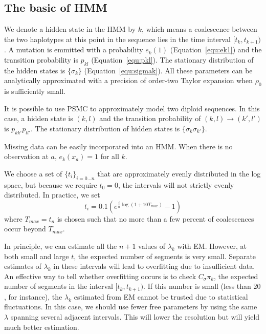 \documentclass[pdftex,10pt]{article}
\begin{document}
\subsection{The basic of HMM}

\begin{rem}\label{rem:hmm}
  We denote a hidden state in the HMM by $k$, which means a coalescence
  between the two haplotypes at this point in the sequence lies in the
  time interval $[t_k,t_{k+1})$. A mutation is emmitted with a
  probability $e_k(1)$ (Equation~\ref{equ:ek1}) and the transition
  probability is $p_{kl}$ (Equation~\ref{equ:pkl}). The stationary
  distribution of the hidden states is $\{\sigma_k\}$
  (Equation~\ref{equ:sigmak}). All these parameters can be analytically
  approximated with a precision of order-two Taylor expansion when
  $\rho_0$ is sufficiently small.
\end{rem}

\begin{rem}\label{rem:phmm}
  It is possible to use PSMC to approximately model two diploid
  sequences. In this case, a hidden state is $(k,l)$ and the transition
  probability of $(k,l)\to(k',l')$ is $p_{kk'}p_{ll'}$. The stationary
  distribution of hidden states is $\{\sigma_k\sigma_{k'}\}$.
\end{rem}

\begin{rem}\label{rem:missdata}
  Missing data can be easily incorporated into an HMM. When there is no
  observation at $a$, $e_k(x_a)=1$ for all $k$.
\end{rem}

\begin{rem}
  We choose a set of $\{t_i\}_{i=0\ldots n}$ that are approximately
  evenly distributed in the log space, but because we require $t_0=0$,
  the intervals will not strictly evenly distributed. In practice, we
  set \[t_i=0.1(e^{\frac{i}{n}\log(1+10T_{max})}-1)\] where
  $T_{max}=t_n$ is chosen such that no more than a few percent of
  coalescences occur beyond $T_{max}$.
\end{rem}

\begin{rem}\label{rem:overfit}
  In principle, we can estimate all the $n+1$ values of $\lambda_k$ with
  EM. However, at both small and large $t$, the expected number of
  segments is very small. Separate estimates of $\lambda_k$ in these
  intervals will lead to overfitting due to insufficient data. An
  effective way to tell whether overfitting occurs is to check
  $C_{\sigma}\pi_k$, the expected number of segments in the interval
  $[t_k,t_{k+1})$. If this number is small (less than $20$, for
  instance), the $\lambda_k$ estimated from EM cannot be trusted due to
  statistical fluctuations. In this case, we should use fewer free
  parameters by using the same $\lambda$ spanning several adjacent
  intervals. This will lower the resolution but will yield much better
  estimation.
\end{rem}
\end{document}
